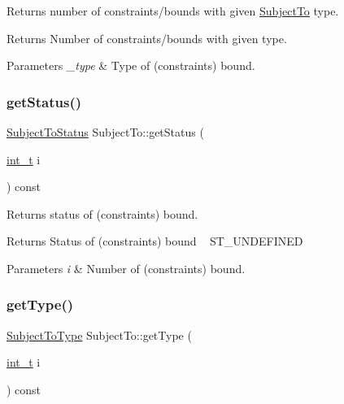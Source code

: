 Returns number of constraints/bounds with given \hyperlink{class_subject_to}{Subject\+To} type. \begin{DoxyReturn}{Returns}
Number of constraints/bounds with given type. 
\end{DoxyReturn}

\begin{DoxyParams}{Parameters}
{\em \+\_\+type} & Type of (constraints\textquotesingle{}) bound. \\
\hline
\end{DoxyParams}
\mbox{\label{class_subject_to_aecff1b8db622e9d1a4412bf9f0643ec3}} 
\subsubsection{\texorpdfstring{get\+Status()}{getStatus()}}
{\footnotesize\ttfamily \hyperlink{_types_8hpp_a70a6a40d261a015ead8d43aa589383a4}{Subject\+To\+Status} Subject\+To\+::get\+Status (\begin{DoxyParamCaption}\item[{\hyperlink{_types_8hpp_ab6fd6105e64ed14a0c9281326f05e623}{int\+\_\+t}}]{i }\end{DoxyParamCaption}) const\hspace{0.3cm}{\ttfamily [inline]}}

Returns status of (constraints\textquotesingle{}) bound. \begin{DoxyReturn}{Returns}
Status of (constraints\textquotesingle{}) bound ~\newline
 S\+T\+\_\+\+U\+N\+D\+E\+F\+I\+N\+ED 
\end{DoxyReturn}

\begin{DoxyParams}{Parameters}
{\em i} & Number of (constraints\textquotesingle{}) bound. \\
\hline
\end{DoxyParams}
\mbox{\label{class_subject_to_a3c09533da89630a79752bf61bedd3583}} 
\subsubsection{\texorpdfstring{get\+Type()}{getType()}}
{\footnotesize\ttfamily \hyperlink{_types_8hpp_a3e65c061dde41562d1aeb2c4453bf1d3}{Subject\+To\+Type} Subject\+To\+::get\+Type (\begin{DoxyParamCaption}\item[{\hyperlink{_types_8hpp_ab6fd6105e64ed14a0c9281326f05e623}{int\+\_\+t}}]{i }\end{DoxyParamCaption}) const\hspace{0.3cm}{\ttfamily [inline]}}

